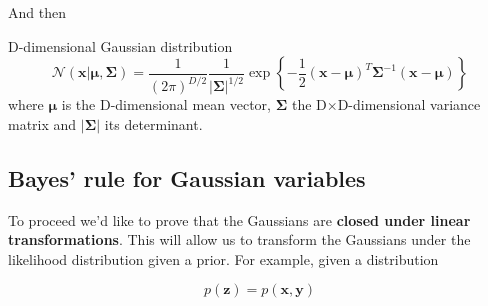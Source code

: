 \begin{frame}{\insertsubsection}
And then
\begin{block}{D-dimensional Gaussian distribution}
\begin{equation*}
	\mathcal{N}(\mathbf{x} | \boldsymbol{\mu}, \boldsymbol{\Sigma}) = \frac{1}{(2 \pi )^{D/2}} \frac{1}{|\boldsymbol{\Sigma}|^{1/2}} \exp \left\{ -\frac{1}{2} (\mathbf{x} - \boldsymbol{\mu})^T \boldsymbol{\Sigma} ^{-1} (\mathbf{x} - \boldsymbol{\mu})  \right\} 
\end{equation*}
where $\boldsymbol{\mu}$ is the D-dimensional mean vector, $\boldsymbol{\Sigma}$ the D$\times$D-dimensional variance matrix and $|\boldsymbol{\Sigma}|$ its determinant.
\end{block}
\end{frame}


\subsection{Bayes' rule for Gaussian variables}

\begin{frame}{\insertsubsection}

To proceed we'd like to prove that the Gaussians are \textbf{closed under linear transformations}. This will allow us to transform the Gaussians under the likelihood distribution given a prior. For example, given a distribution

\begin{equation*}
	p(\mathbf{z}) = p(\mathbf{x},\mathbf{y})
\end{equation*}

\end{frame}

\begin{frame}{\insertsubsection}
\end{frame}

